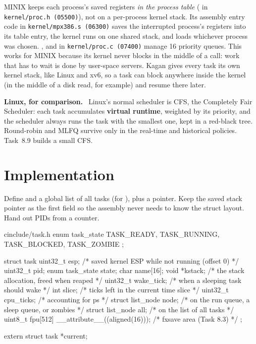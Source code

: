 \documentclass[11pt,a4paper]{article}
\begin{document}
\begin{minixbox}
MINIX keeps each process's saved registers \emph{in the process table} ( in \texttt{kernel/proc.h
(05500)}), not on a per-process kernel stack. Its assembly entry code in \texttt{kernel/mpx386.s (06300)} saves the
interrupted process's registers into its table entry, the kernel runs on one shared stack, and  loads
whichever process was chosen. ,  and  in \texttt{kernel/proc.c (07400)}
manage 16 priority queues. This works for MINIX because its kernel never blocks in the middle of a call: work that has
to wait is done by user-space servers. Kagan gives every task its own kernel stack, like Linux and xv6, so a task can
block anywhere inside the kernel (in the middle of a disk read, for example) and resume there later.

\par\smallskip\textbf{Linux, for comparison.} \LKD\ \LKP Linux's normal scheduler is CFS, the Completely Fair Scheduler: each task accumulates \textbf{virtual runtime}, weighted by its priority, and the scheduler always runs the task with the smallest one, kept in a red-black tree. Round-robin and MLFQ survive only in the real-time and historical policies. Task~8.9 builds a small CFS.
\end{minixbox}

\section{Implementation}

Define  and a global list of all tasks (for ), plus a  pointer. Keep the
saved stack pointer as the first field so the assembly never needs to know the struct layout. Hand out PIDs from a
counter.

\begin{lst}{c}{include/task.h}
enum task_state { TASK_READY, TASK_RUNNING, TASK_BLOCKED, TASK_ZOMBIE };

struct task {
    uint32_t         esp;          /* saved kernel ESP while not running (offset 0)  */
    uint32_t         pid;
    enum task_state  state;
    char             name[16];
    void            *kstack;       /* the stack allocation, freed when reaped        */
    uint32_t         wake_tick;    /* when a sleeping task should wake               */
    int              slice;        /* ticks left in the current time slice           */
    uint32_t         cpu_ticks;    /* accounting for ps                              */
    struct list_node node;         /* on the run queue, a sleep queue, or zombies    */
    struct list_node all;          /* on the list of all tasks                       */
    uint8_t          fpu[512] __attribute__((aligned(16)));  /* fxsave area (Task 8.3) */
};

extern struct task *current;
\end{lst}
\end{document}
